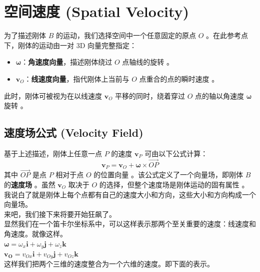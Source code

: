 \section{空间速度 (Spatial Velocity)}
为了描述刚体 $B$ 的运动，我们选择空间中一个任意固定的原点 $O$ 。在此参考点下，刚体的运动由一对 3D 向量完整指定：
\begin{itemize}
    \item $\bm{\omega}$：\textbf{角速度向量}，描述刚体绕过 $O$ 点轴线的旋转 。
    \item $\bm{v}_O$：\textbf{线速度向量}，指代刚体上当前与 $O$ 点重合的点的瞬时速度 。
\end{itemize}
此时，刚体可被视为在以线速度 $\bm{v}_O$ 平移的同时，绕着穿过 $O$ 点的轴以角速度 $\bm{\omega}$ 旋转 。

\subsection{速度场公式 (Velocity Field)}
基于上述描述，刚体上任意一点 $P$ 的速度 $\bm{v}_P$ 可由以下公式计算：
\begin{equation}
\bm{v}_P = \bm{v}_O + \bm{\omega} \times \vec{OP} \tag{2.1}
\end{equation}
其中 $\vec{OP}$ 是点 $P$ 相对于点 $O$ 的位置向量 。该公式定义了一个向量场，即刚体 $B$ 的\textbf{速度场} 。虽然 $\bm{v}_O$ 取决于 $O$ 的选择，但整个速度场是刚体运动的固有属性 。\\
我说白了就是刚体上每个点都有自己的速度大小和方向，这些大小和方向构成一个向量场。\\
来吧，我们接下来将要开始狂飙了。\\
显然我们在一个笛卡尔坐标系中，可以这样表示那两个至关重要的速度：线速度和角速度。就像这样。\\$\bm{\omega}=\omega_x\bm{i}+\omega_y\bm{j}+\omega_z\bm{k}$\\
$\bm{v_O}=v_{Ox}\bm{i}+v_{Oy}\bm{j}+v_{Oz}\bm{k}$\\
这样我们把两个三维的速度整合为一个六维的速度。即下面的表示。

